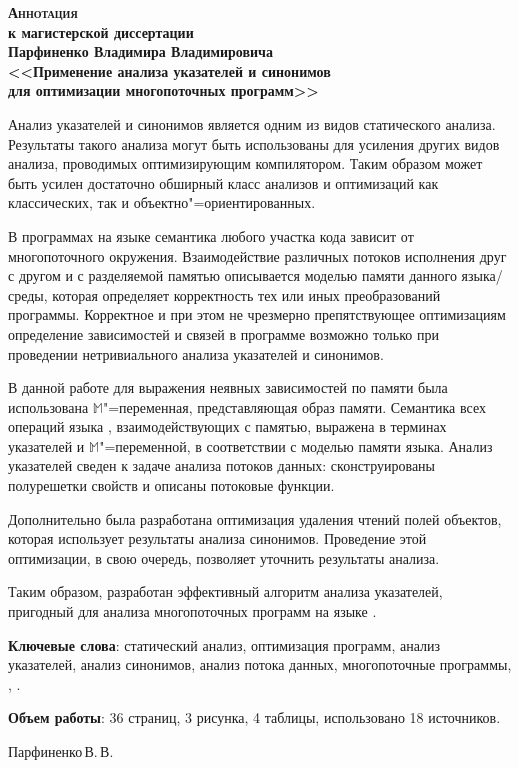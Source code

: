 \documentclass[12pt]{article}
\begin{document}
  \thispagestyle{empty}

  \begin{center}
    \bfseries
    {\Large \scshape Аннотация}\\
    к магистерской диссертации\\
    Парфиненко Владимира Владимировича\\
    {\large
      <<Применение анализа указателей и синонимов\\
      для оптимизации многопоточных программ>>\\
    }
  \end{center}

  Анализ указателей и синонимов является одним из видов статического анализа.
  Результаты такого анализа могут быть использованы для усиления других видов
  анализа, проводимых оптимизирующим компилятором.
  Таким образом может быть усилен достаточно обширный класс анализов и
  оптимизаций как классических, так и объектно"=ориентированных.

  В программах на языке  семантика любого участка кода зависит от
  многопоточного окружения.
  Взаимодействие различных потоков исполнения друг с другом и с разделяемой
  памятью описывается моделью памяти данного языка\slash{}среды, которая
  определяет корректность тех или иных преобразований программы.
  Корректное и при этом не чрезмерно препятствующее оптимизациям определение
  зависимостей и связей в программе возможно только при проведении
  нетривиального анализа указателей и синонимов.

  В данной работе для выражения неявных зависимостей по памяти была
  использована $\mathbb{M}$"=переменная, представляющая образ памяти.
  Семантика всех операций языка , взаимодействующих с памятью,
  выражена в терминах указателей и $\mathbb{M}$"=переменной, в соответствии с
  моделью памяти языка.
  Анализ указателей сведен к задаче анализа потоков данных: сконструированы
  полурешетки свойств и описаны потоковые функции.

  Дополнительно была разработана оптимизация удаления чтений полей объектов,
  которая использует результаты анализа синонимов.
  Проведение этой оптимизации, в свою очередь, позволяет уточнить результаты
  анализа.

  Таким образом, разработан эффективный алгоритм анализа указателей, пригодный
  для анализа многопоточных программ на языке .

  \vspace{0.5cm}

  \textbf{Ключевые слова}: статический анализ, оптимизация программ, анализ
  указателей, анализ синонимов, анализ потока данных, многопоточные программы,
  , .

  \textbf{Объем работы}: 36 страниц, 3 рисунка, 4 таблицы, использовано 18
  источников.

  \begin{flushright}
    Парфиненко\,В.\,В.
  \end{flushright}
\end{document}
